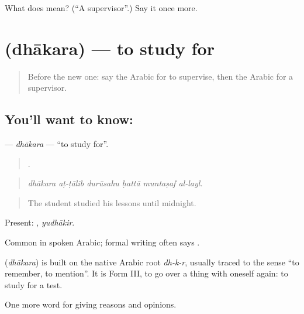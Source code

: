 \begin{tcolorbox}[breakable,colback=teal!4,colframe=teal!35!black,title={Before you move on}]
What does  mean? (\textquotedblleft{}A supervisor\textquotedblright{}.) Say it once more.
\end{tcolorbox}
\section[\texorpdfstring{\ar{ذاكر} (dhākara)}{ذاكر (dhākara)}]{ (dhākara) — to study for}

\label{lesson:AR-C392-dhakara}



\begin{quote}
Before the new one: say the Arabic for to supervise, then the Arabic for a supervisor.
\end{quote}

\subsection*{You'll want to know: }
\textbf{} — \emph{dhākara} — \textquotedblleft{}to study for\textquotedblright{}.

\begin{quote}
     .
\end{quote}

\begin{quote}
\emph{dhākara aṭ-ṭālib durūsahu ḥattā muntaṣaf al-layl.}
\end{quote}

\begin{quote}
The student studied his lessons until midnight.
\end{quote}

Present: , \emph{yudhākir}.

Common in spoken Arabic; formal writing often says .

\begin{cousinweb}
\textbf{} (\emph{dhākara}) is built on the native Arabic root \emph{dh-k-r}, usually traced to the sense \textquotedblleft{}to remember, to mention\textquotedblright{}. It is Form III, to go over a thing with oneself again: to study for a test.
\end{cousinweb}

\begin{grammarlens}[title={What you've built}]
One more word for giving reasons and opinions.
\end{grammarlens}

